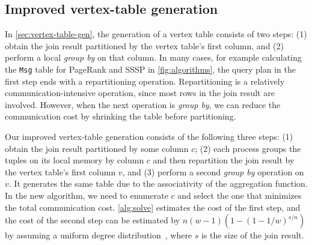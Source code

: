 \documentclass{sokendai_thesis} %
\begin{document}
\subsection{Improved vertex-table generation}

In \autoref{sec:vertex-table-gen}, the generation of a vertex table consists of two steps: (1) obtain the join result partitioned by the vertex table's first column, and (2) perform a local \textit{group by} on that column.
In many cases, for example calculating the \texttt{Msg} table for PageRank and SSSP in \autoref{fig:algorithms}, the query plan in the first step ends with a repartitioning operation.
Repartitioning is a relatively communication-intensive operation, since most rows in the join result are involved.
However, when the next operation is \textit{group by}, we can reduce the communication cost by shrinking the table before partitioning.

Our improved vertex-table generation consists of the following three steps: (1) obtain the join result partitioned by some column $c$; (2) each process groups the tuples on its local memory by column $c$ and then repartition the join result by the vertex table's first column $v$, and (3) perform a second \textit{group by} operation on $v$.
It generates the same table due to the associativity of the aggregation function.
In the new algorithm, we need to enumerate $c$ and select the one that minimizes the total communication cost.
\autoref{alg:solve} estimates the cost of the first step, and the cost of the second step can be estimated by $n(w-1)(1-(1-1/w)^{s/n})$ by assuming a uniform degree distribution~\cite{balanced}, where $s$ is the size of the join result.



\end{document}
